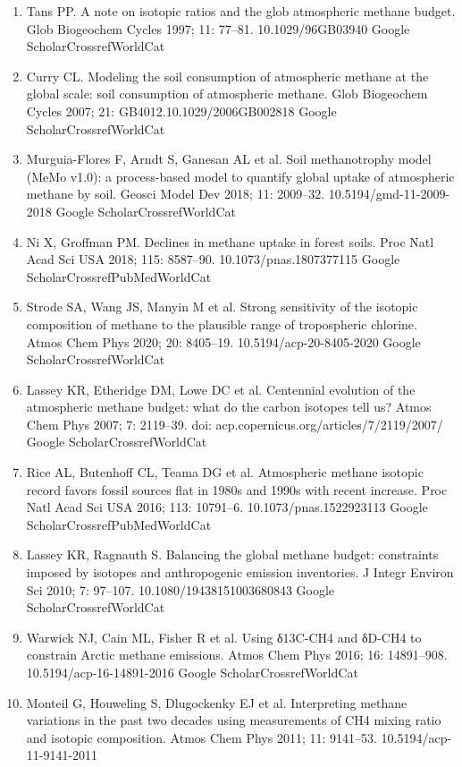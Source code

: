 \documentclass[a4paper,12pt]{article}
\begin{document}
{\begin{thebibliography}{}
\begin{enumerate}
    Google ScholarCrossrefPubMedWorldCat 
    \item	Tans PP. A note on isotopic ratios and the glob atmospheric methane budget. Glob Biogeochem Cycles 1997; 11: 77–81. 10.1029/96GB03940
    Google ScholarCrossrefWorldCat 
    \item	Curry CL. Modeling the soil consumption of atmospheric methane at the global scale: soil consumption of atmospheric methane. Glob Biogeochem Cycles 2007; 21: GB4012.10.1029/2006GB002818
    Google ScholarCrossrefWorldCat 
    \item	Murguia-Flores F, Arndt S, Ganesan AL et al.  Soil methanotrophy model (MeMo v1.0): a process-based model to quantify global uptake of atmospheric methane by soil. Geosci Model Dev 2018; 11: 2009–32. 10.5194/gmd-11-2009-2018
    Google ScholarCrossrefWorldCat 
    \item	Ni X, Groffman PM. Declines in methane uptake in forest soils. Proc Natl Acad Sci USA 2018; 115: 8587–90. 10.1073/pnas.1807377115
    Google ScholarCrossrefPubMedWorldCat 
    \item	Strode SA, Wang JS, Manyin M et al.  Strong sensitivity of the isotopic composition of methane to the plausible range of tropospheric chlorine. Atmos Chem Phys 2020; 20: 8405–19. 10.5194/acp-20-8405-2020
    Google ScholarCrossrefWorldCat 
    \item	Lassey KR, Etheridge DM, Lowe DC et al.  Centennial evolution of the atmospheric methane budget: what do the carbon isotopes tell us? Atmos Chem Phys 2007; 7: 2119–39. doi: acp.copernicus.org/articles/7/2119/2007/
    Google ScholarCrossrefWorldCat 
    \item	Rice AL, Butenhoff CL, Teama DG et al.  Atmospheric methane isotopic record favors fossil sources flat in 1980s and 1990s with recent increase. Proc Natl Acad Sci USA 2016; 113: 10791–6. 10.1073/pnas.1522923113
    Google ScholarCrossrefPubMedWorldCat 
    \item	Lassey KR, Ragnauth S. Balancing the global methane budget: constraints imposed by isotopes and anthropogenic emission inventories. J Integr Environ Sci 2010; 7: 97–107. 10.1080/19438151003680843
    Google ScholarCrossrefWorldCat 
    \item	Warwick NJ, Cain ML, Fisher R et al.  Using δ13C-CH4 and δD-CH4 to constrain Arctic methane emissions. Atmos Chem Phys 2016; 16: 14891–908. 10.5194/acp-16-14891-2016
    Google ScholarCrossrefWorldCat 
    \item	Monteil G, Houweling S, Dlugockenky EJ et al.  Interpreting methane variations in the past two decades using measurements of CH4 mixing ratio and isotopic composition. Atmos Chem Phys 2011; 11: 9141–53. 10.5194/acp-11-9141-2011

\end{enumerate}
\end{thebibliography}}
\end{document}
